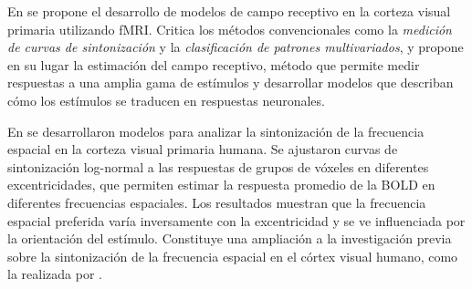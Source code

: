 En \cite{kriegeskorte_understanding_2011} se propone el desarrollo de modelos de campo receptivo en la corteza visual primaria utilizando fMRI. Critica los métodos convencionales como la \textit{medición de curvas de sintonización} y la \textit{clasificación de patrones multivariados}, y propone en su lugar la estimación del campo receptivo, método que permite medir respuestas a una amplia gama de estímulos y desarrollar modelos que describan cómo los estímulos se traducen en respuestas neuronales.

En \cite{broderick_mapping_2022} se desarrollaron modelos para analizar la sintonización de la frecuencia espacial en la corteza visual primaria humana. Se ajustaron curvas de sintonización log-normal a las respuestas de grupos de vóxeles en diferentes excentricidades, que permiten estimar la respuesta promedio de la BOLD en diferentes frecuencias espaciales. Los resultados muestran que la frecuencia espacial preferida varía inversamente con la excentricidad y se ve influenciada por la orientación del estímulo. Constituye una ampliaci\'on a la investigación previa sobre la sintonización de la frecuencia espacial en el córtex visual humano, como la realizada por \cite{aghajari_population_2020}. 






